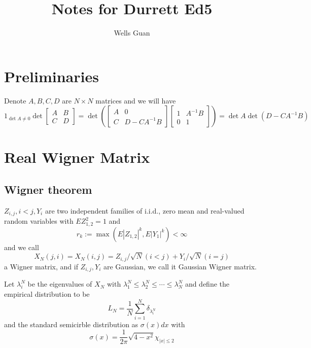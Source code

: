 \documentclass[lang=en, color=blue, ]{elegantbook}
\title{Notes for Durrett Ed5}
\author{Wells Guan}
\begin{document}

\chapter{Preliminaries}

\begin{lemma}
    Denote $A,B,C,D$ are $N\times N$ matrices and we will have
    \[
    1_{\det A \neq 0}\det\left[\begin{array}{cc}
        A & B \\
        C & D
    \end{array}\right] = \det\left(\left[\begin{array}{cc}
        A & 0 \\
        C & D-CA^{-1}B
    \end{array}\right]\left[\begin{array}{cc}
        1 & A^{-1}B \\
        0 & 1
    \end{array}\right]\right) = \det A \det (D-CA^{-1}B)
    \]
\end{lemma}

\begin{lemma}
    
\end{lemma}

\chapter{Real Wigner Matrix}

\section{Wigner theorem}

\begin{definition}
    $Z_{i,j}, i<j, Y_i$ are two independent families of i.i.d., zero mean and real-valued random variables with $EZ_{1,2}^2 = 1$ and
    \[r_k := \max(E|Z_{1,2}|^k,E|Y_1|^k) < \infty\]
    and we call 
    \[X_N(j,i) = X_N(i,j) = Z_{i,j}/\sqrt{N}(i<j) + Y_i/\sqrt{N}(i=j)\]
    a Wigner matrix, and if $Z_{i,j},Y_i$ are Gaussian, we call it Gaussian Wigner matrix.\par
    Let $\lambda_i^N$ be the eigenvalues of $X_N$ with $\lambda_1^N \leq \lambda_2^N \leq \cdots \leq \lambda_N^N$ and define the empirical distribution to be
    \[L_N = \dfrac{1}{N}\sum\limits_{i=1}^N\delta_{\lambda_i^N}\]
    and the standard semicirble distribution as $\sigma(x)dx$ with
    \[
    \sigma(x) = \dfrac{1}{2\pi}\sqrt{4-x^2}\chi_{|x|\leq 2}
    \]
\end{definition}
\end{document}
